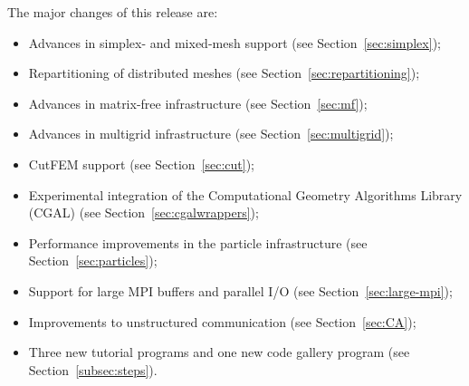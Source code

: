 \documentclass{ansarticle-preprint}
\begin{document}
The major changes of this release are:
%
\begin{itemize}
  \item Advances in simplex- and mixed-mesh support (see Section~\ref{sec:simplex});
  \item Repartitioning of distributed meshes (see Section~\ref{sec:repartitioning});
  \item Advances in matrix-free infrastructure (see Section~\ref{sec:mf});
  \item Advances in multigrid infrastructure (see Section~\ref{sec:multigrid});
  \item CutFEM support (see Section~\ref{sec:cut});
  \item Experimental integration of the Computational Geometry Algorithms Library (CGAL) (see Section~\ref{sec:cgalwrappers});
  \item Performance improvements in the particle infrastructure (see Section~\ref{sec:particles});
  \item Support for large MPI buffers and parallel I/O (see Section~\ref{sec:large-mpi});
  \item Improvements to unstructured communication (see Section~\ref{sec:CA});
  \item Three new tutorial programs and one new code gallery program (see Section~\ref{subsec:steps}).
\end{itemize}
%
\end{document}
